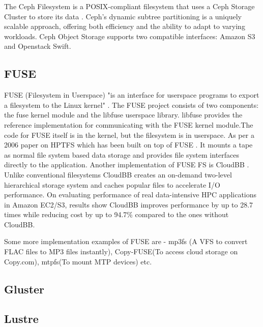 {     The Ceph Filesystem is a POSIX-compliant
     filesystem that uses a Ceph Storage Cluster to store its
     data \cite{www-cephfs}. Ceph’s dynamic subtree partitioning
     is a uniquely scalable
     approach, offering both efficiency and the ability to adapt to
     varying workloads. Ceph Object Storage supports two compatible
     interfaces: Amazon S3 and Openstack Swift.

     \pv

\subsection{FUSE}

     FUSE (Filesystem in Userspace) "is an interface
     for userspace programs to export a filesystem to the Linux
     kernel" \cite{www-fuse}. The FUSE project consists of two components: the fuse
     kernel module and the libfuse userspace library. libfuse provides
     the reference implementation for communicating with the FUSE
     kernel module.The code for FUSE itself is in the kernel, but the
     filesystem is in userspace.  As per a 2006 paper
     on HPTFS which has been built on top of
     FUSE \cite{fuse-paper-hptfs}. It mounts a tape as normal file system based data storage
     and provides file system interfaces directly to the application.
     Another implementation of FUSE FS is CloudBB
     \cite{fuse-paper-CloudBB}. Unlike conventional filesystems
     CloudBB creates an on-demand two-level hierarchical storage
     system and caches popular files to accelerate I/O performance. On
     evaluating performance of real data-intensive HPC applications in
     Amazon EC2/S3, results show CloudBB improves performance by up to
     28.7 times while reducing cost by up to 94.7\% compared to the
     ones without CloudBB.

     Some more implementation examples of FUSE are - mp3fs (A VFS to
     convert FLAC files to MP3 files instantly), Copy-FUSE(To access
     cloud storage on Copy.com), mtpfs(To mount MTP devices) etc.

     \pv

\subsection{Gluster}

\pv 

\subsection{Lustre}

}
